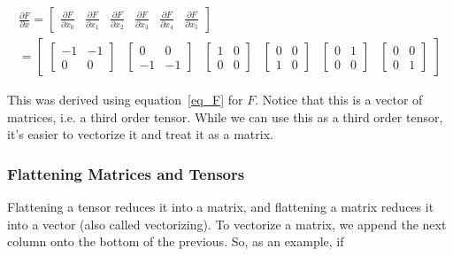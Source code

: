 \documentclass[twocolumn,10pt]{asme2ej}
\begin{document}
\begin{equation}
  \begin{split}
    \frac{\partial F}{\partial x} = \begin{bmatrix} \frac{\partial F}{\partial x_0} & \frac{\partial F}{\partial x_1}
    & \frac{\partial F}{\partial x_2} & \frac{\partial F}{\partial x_3} & \frac{\partial F}{\partial x_4}
    & \frac{\partial F}{\partial x_5} \end{bmatrix} \\
    = \begin{bmatrix} \begin{bmatrix} -1 & -1 \\ 0 & 0 \end{bmatrix} & \begin{bmatrix} 0 & 0 \\ -1 & -1 \end{bmatrix}
  & \begin{bmatrix} 1 & 0 \\ 0 & 0 \end{bmatrix} & \begin{bmatrix} 0 & 0 \\ 1 & 0 \end{bmatrix}
  & \begin{bmatrix} 0 & 1 \\ 0 & 0 \end{bmatrix} & \begin{bmatrix} 0 & 0 \\ 0 & 1 \end{bmatrix}\end{bmatrix}
  \end{split}
\label{eq_dFdx}
\end{equation}

This was derived using equation~\ref{eq_F} for $F$. Notice that this is a vector of matrices, i.e. a third order tensor. While we can use this as a third order tensor, it's easier to vectorize it and treat it as a matrix.

\subsubsection{Flattening Matrices and Tensors}

Flattening a tensor reduces it into a matrix, and flattening a matrix reduces it into a vector (also called vectorizing). To vectorize a matrix, we append the next column onto the bottom of the previous. So, as an example, if
\end{document}
